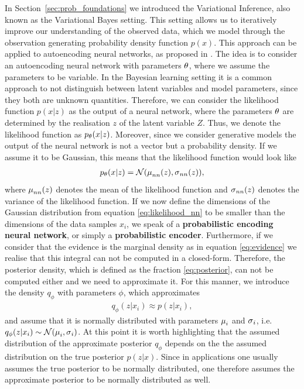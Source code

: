 In Section~\ref{sec:prob_foundations} we introduced the Variational Inference, also known as the Variational Bayes setting. This setting allows us to iteratively improve our understanding of the observed data, which we model through the observation generating probability density function $p(x)$. This approach can be applied to autoencoding neural networks, as proposed in \cite{kingma2013auto}. The idea is to consider an autoencoding neural network with parameters $\theta$, where we assume the parameters to be variable. In the Bayesian learning setting it is a common approach to not distinguish between latent variables and model parameters, since they both are unknown quantities. Therefore, we can consider the likelihood function $p(x|z)$ as the output of a neural network, where the parameters $\theta$ are determined by the realisation $z$ of the latent variable $Z$. Thus, we denote the likelihood function as $p_\theta(x|z)$. Moreover, since we consider generative models the output of the neural network is not a vector but a probability density. If we assume it to be Gaussian, this means that the likelihood function would look like
\begin{align}\label{eq:likelihood_nn}
p_\theta(x|z) = \mathcal{N} (\operatorname{\mu}_{nn}(z), \operatorname{\sigma}_{nn}(z)),
\end{align}
where $\operatorname{\mu}_{nn}(z)$ denotes the mean of the likelihood function and $\operatorname{\sigma}_{nn}(z)$  denotes the variance of the likelihood function. If we now define the dimensions of the Gaussian distribution from equation \eqref{eq:likelihood_nn} to be smaller than the dimensions of the data samples $x_i$, we speak of a \textbf{probabilistic encoding neural network}, or simply a \textbf{probabilistic encoder}.  Furthermore, if we consider that the evidence is the marginal density as in equation \eqref{eq:evidence} we realise that this integral can not be computed in a closed-form. Therefore, the posterior density, which is defined as the fraction \eqref{eq:posterior}, can not be computed either and we need to approximate it. For this manner, we introduce the density $q_{\phi}$ with parameters $\phi$, which approximates
\begin{align*}
q_{\phi}(z|x_i) \approx p(z|x_i),
\end{align*}
and assume that it is normally distributed with parameters $\operatorname{\mu}_i$ and $\operatorname{\sigma}_i$, i.e. $q_{\phi}(z|x_i) \sim \mathcal{N} (\operatorname{\mu}_i, \operatorname{\sigma}_i)$. At this point it is worth highlighting that the assumed distribution of the approximate posterior $q_{\phi}$ depends on the the assumed distribution on the true posterior $p(z|x)$. Since in applications one usually assumes the true posterior to be normally distributed, one therefore assumes the approximate posterior to be normally distributed as well.\\
